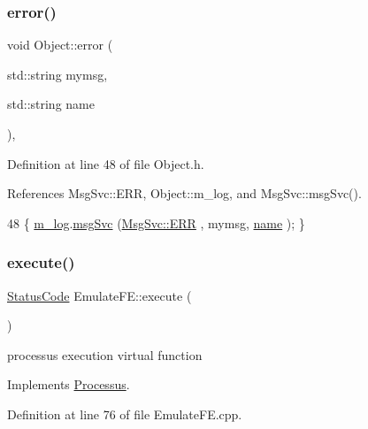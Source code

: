 \subsubsection{\texorpdfstring{error()}{error()}\hspace{0.1cm}{\footnotesize\ttfamily [2/2]}}
{\footnotesize\ttfamily void Object\+::error (\begin{DoxyParamCaption}\item[{std\+::string}]{mymsg,  }\item[{std\+::string}]{name }\end{DoxyParamCaption})\hspace{0.3cm}{\ttfamily [inline]}, {\ttfamily [inherited]}}



Definition at line 48 of file Object.\+h.



References Msg\+Svc\+::\+E\+RR, Object\+::m\+\_\+log, and Msg\+Svc\+::msg\+Svc().


\begin{DoxyCode}
48 \{ \hyperlink{classObject_a0d269813dd7ac1f24bc143031e2963f2}{m\_log}.\hyperlink{classMsgSvc_ad25f18047920cc59a314e5098259711c}{msgSvc} (\hyperlink{classMsgSvc_ae671eb7301996cd049d2da8a65925926a35a9d7166e9896af4ec8fb33bf5f1772}{MsgSvc::ERR}     , mymsg, \hyperlink{classObject_a300f4c05dd468c7bb8b3c968868443c1}{name} ); \}
\end{DoxyCode}
\mbox{\label{classEmulateFE_a5133d5b45521fc311db62d61217848b9}} 
\subsubsection{\texorpdfstring{execute()}{execute()}}
{\footnotesize\ttfamily \hyperlink{classStatusCode}{Status\+Code} Emulate\+F\+E\+::execute (\begin{DoxyParamCaption}{ }\end{DoxyParamCaption})\hspace{0.3cm}{\ttfamily [virtual]}}

processus execution virtual function 

Implements \hyperlink{classProcessus_a63767a63a1fb0055c5aa45b21a4a5d58}{Processus}.



Definition at line 76 of file Emulate\+F\+E.\+cpp.



